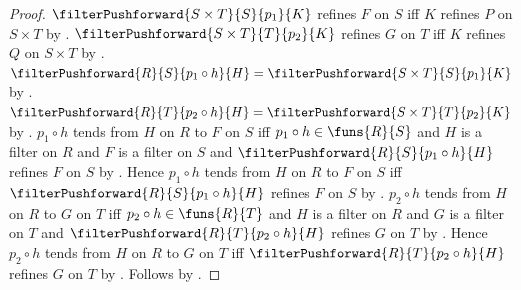 \begin{proof}
    $\filterPushforward{S\times T}{S}{p_1}{K}$ refines $F$ on $S$ iff
        $K$ refines $P$ on $S\times T$ by
        .
    $\filterPushforward{S\times T}{T}{p_2}{K}$ refines $G$ on $T$ iff
        $K$ refines $Q$ on $S\times T$ by
        .
    $\filterPushforward{R}{S}{p_1\circ h}{H}
        =\filterPushforward{S\times T}{S}{p_1}{K}$ by
        .
    $\filterPushforward{R}{T}{p_2\circ h}{H}
        =\filterPushforward{S\times T}{T}{p_2}{K}$ by
        .
    $p_1\circ h$ tends from $H$ on $R$ to $F$ on $S$ iff
        $p_1\circ h\in\funs{R}{S}$ and $H$ is a filter on $R$ and
        $F$ is a filter on $S$ and
        $\filterPushforward{R}{S}{p_1\circ h}{H}$ refines $F$ on $S$ by
        .
    Hence $p_1\circ h$ tends from $H$ on $R$ to $F$ on $S$ iff
        $\filterPushforward{R}{S}{p_1\circ h}{H}$ refines $F$ on $S$ by
        \auto.
    $p_2\circ h$ tends from $H$ on $R$ to $G$ on $T$ iff
        $p_2\circ h\in\funs{R}{T}$ and $H$ is a filter on $R$ and
        $G$ is a filter on $T$ and
        $\filterPushforward{R}{T}{p_2\circ h}{H}$ refines $G$ on $T$ by
        .
    Hence $p_2\circ h$ tends from $H$ on $R$ to $G$ on $T$ iff
        $\filterPushforward{R}{T}{p_2\circ h}{H}$ refines $G$ on $T$ by
        \auto.
    Follows by \auto.
\end{proof}

